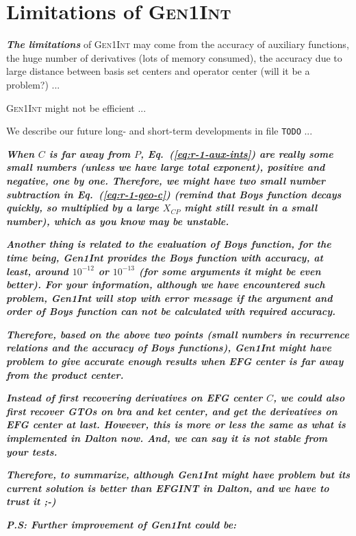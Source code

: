 \documentclass[a4paper,11pt,twoside,openright]{book}
\newcommand{\fixme}[1]{\textbf{\textit{\color{red} #1}}}
\begin{document}
\chapter{Limitations of \textsc{Gen1Int}}
\label{chap:limitations}

\fixme{The limitations} of \textsc{Gen1Int} may come from the accuracy of auxiliary functions,
the huge number of derivatives (lots of memory consumed), the accuracy due to large distance
between basis set centers and operator center (will it be a problem?) ...

\textsc{Gen1Int} might not be efficient ...

We describe our future long- and short-term developments in file \verb|TODO| ...

\fixme{When $C$ is far away from $P$, Eq.~(\ref{eq:r-1-aux-ints}) are really some small numbers (unless we have large total exponent), positive and negative, one by one. Therefore, we might have two small number subtraction in Eq.~(\ref{eq:r-1-geo-c}) (remind that Boys function decays quickly, so multiplied by a large $X_{CP}$ might still result in a small number), which as you know may be unstable.}

\fixme{Another thing is related to the evaluation of Boys function, for the time being, Gen1Int provides the Boys function with accuracy, at least, around $10^{-12}$ or $10^{-13}$ (for some arguments it might be even better). For your information, although we have encountered such problem, Gen1Int will stop with error message if the argument and order of Boys function can not be calculated with required accuracy.}

\fixme{Therefore, based on the above two points (small numbers in recurrence relations and the accuracy of Boys functions), Gen1Int might have problem to give accurate enough results when EFG center is far away from the product center.}

\fixme{Instead of first recovering derivatives on EFG center $C$, we could also first recover GTOs on bra and ket center, and get the derivatives on EFG center at last. However, this is more or less the same as what is implemented in Dalton now. And, we can say it is not stable from your tests.}

\fixme{Therefore, to summarize, although Gen1Int might have problem but its current solution is better than EFGINT in Dalton, and we have to trust it ;-)}

\fixme{P.S: Further improvement of Gen1Int could be:}
\end{document}
